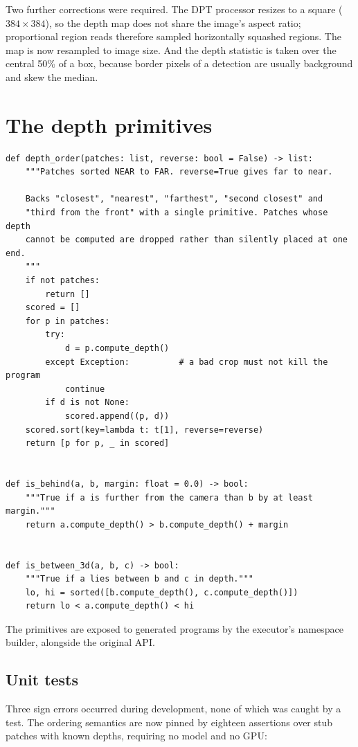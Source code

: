 \documentclass[12pt,a4paper,oneside]{report}
\begin{document}
Two further corrections were required. The DPT processor resizes to a square
($384 \times 384$), so the depth map does not share the image's aspect ratio;
proportional region reads therefore sampled horizontally squashed regions. The map is
now resampled to image size. And the depth statistic is taken over the central 50\% of
a box, because border pixels of a detection are usually background and skew the median.

\section{The depth primitives}

\begin{lstlisting}[caption={The contributed primitives, from
\texttt{pipeline/image\_patch.py}. All follow the convention LARGER = FURTHER.}]
def depth_order(patches: list, reverse: bool = False) -> list:
    """Patches sorted NEAR to FAR. reverse=True gives far to near.

    Backs "closest", "nearest", "farthest", "second closest" and
    "third from the front" with a single primitive. Patches whose depth
    cannot be computed are dropped rather than silently placed at one end.
    """
    if not patches:
        return []
    scored = []
    for p in patches:
        try:
            d = p.compute_depth()
        except Exception:          # a bad crop must not kill the program
            continue
        if d is not None:
            scored.append((p, d))
    scored.sort(key=lambda t: t[1], reverse=reverse)
    return [p for p, _ in scored]


def is_behind(a, b, margin: float = 0.0) -> bool:
    """True if a is further from the camera than b by at least margin."""
    return a.compute_depth() > b.compute_depth() + margin


def is_between_3d(a, b, c) -> bool:
    """True if a lies between b and c in depth."""
    lo, hi = sorted([b.compute_depth(), c.compute_depth()])
    return lo < a.compute_depth() < hi
\end{lstlisting}

The primitives are exposed to generated programs by the executor's namespace builder,
alongside the original API.

\subsection{Unit tests}

Three sign errors occurred during development, none of which was caught by a test.
The ordering semantics are now pinned by eighteen assertions over stub patches with
known depths, requiring no model and no GPU:
\end{document}
